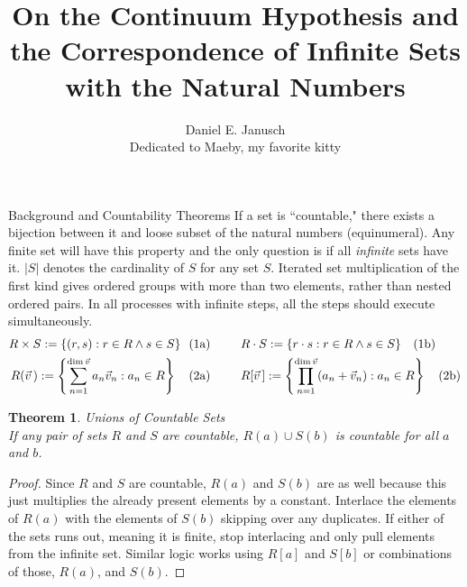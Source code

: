 \documentclass[12pt]{article}
\newtheorem{thm}{Theorem}
\begin{document}
\title{On the Continuum Hypothesis and the Correspondence of Infinite Sets with the Natural Numbers}
\author{Daniel E. Janusch\\Dedicated to Maeby, my favorite kitty}
\maketitle

\begin{section}{Background and Countability Theorems}\label{sec:background}
	If a set is ``countable," there exists a bijection between it and loose subset of the
	natural numbers (equinumeral). Any finite set will have this property and the only
	question is if all \emph{infinite} sets have it. $|S|$ denotes the cardinality of $S$
	for any set $S$. Iterated set multiplication of the first kind gives ordered groups
	with more than two elements, rather than nested ordered pairs. In all processes
	with infinite steps, all the steps should execute simultaneously.\vspace{-1em}\\
	\begin{align}
		R\times S :=\{(r,s):r\in R\land s\in S\}~~(1 & \text a)
		\hspace{2.5em}
		R\cdot S :=\{r\cdot s:r\in R\land s\in S\}~~~(1\text b)
		\\
		R(\vec v\,):=\left\{\sum_{n=1}^{\dim\vec v}a_n\vec v_n:a_n\in R\right\}~~~(2 & \text a)
		\hspace{2.5em}
		R[\vec v\,]:=\left\{\prod_{n=1}^{\dim\vec v}(a_n+\vec v_n):a_n\in R\right\}~~~(2\text b)
	\end{align}

	\begin{thm}\label{thm:finite unions}
		\emph{Unions of Countable Sets}\\
		\indent\emph{If any pair of sets $R$ and $S$ are countable, $R(a)\cup S(b)$ is countable for all $a$ and $b$.}
	\end{thm}\begin{proof}
		Since $R$ and $S$ are countable, $R(a)$ and $S(b)$ are as well because this just
		multiplies the already present elements by a constant. Interlace the elements of
		$R(a)$ with the elements of $S(b)$ skipping over any duplicates. If either of the
		sets runs out, meaning it is finite, stop interlacing and only pull elements from
		the infinite set. Similar logic works using $R[a]$ and $S[b]$ or combinations of
		those, $R(a)$, and $S(b)$.
	\end{proof}


\end{section}
\end{document}
